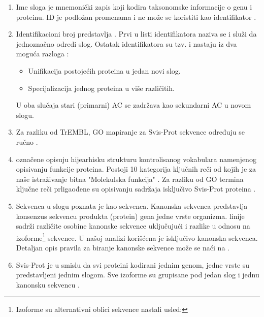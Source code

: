 \begin{enumerate}
  \item Ime sloga   je mnemonički zapis koji kodira
    taksonomske informacije o genu i proteinu. ID je podložan promenama 
    i ne može se koristiti kao identifikator \parencite{www_svisprot}.
  \item Identifikacioni broj predstavlja  .
    Prvi u listi identifikatora naziva se  i služi da
    jednoznačno odredi slog. Ostatak identifikatora su tzv.  i
    nastaju iz dva moguća razloga \parencite{svisprot2003, www_svisprot}:
    \begin{itemize}
      \item Unifikacija postojećih proteina u jedan novi slog. 
      \item Specijalizacija jednog proteina u više različitih.
    \end{itemize}
    U oba slučaja stari (primarni) AC se zadržava kao sekundarni AC u novom slogu.

  \item Za razliku od TrEMBL, GO mapiranje za Svis-Prot sekvence određuju se ručno \parencite{www_svisprot}.

  \item {}  označene  opisuju
    hijearhisku strukturu kontrolisanog vokabulara namenjenog opisivanju
    funkcije proteina. Postoji 10 kategorija ključnih reči od kojih je za naše
    istraživanje bitna "Molekulska funkcija" \parencite{svisprot2003}.  Za razliku od GO termina ključne
    reči prligaođene su opisivanju sadržaja isključivo Svis-Prot proteina \parencite{www_svisprot}.

  \item Sekvenca  u slogu poznata je kao 
     sekvenca. Kanonska sekvenca predstavlja konsenzus sekvencu
    produkta (protein) gena jedne vrste organizma.  
    linije sadrži različite osobine kanonske sekvence uključujući i razlike u
    odnosu na izoforme\footnote{Izoforme su alternativni oblici sekvence
      nastali usled:  } sekvence.  U našoj
    analizi korišćena je isključivo kanonska sekvenca. Detaljan opis pravila za
    biranje kanonske sekvence može se naći na \parencite{www_svisprot}.

  \item
    \label{red}
    Svis-Prot je  u smislu da svi proteini
    kodirani jednim genom, jedne vrste su predstavljeni jednim slogom. Sve
    izoforme su grupisane pod jedan slog i jednu kanonsku sekvencu \parencite{nonRedundant}.


\end{enumerate}
